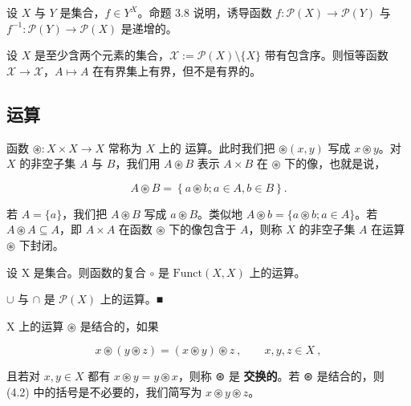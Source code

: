 \begin{example}

\begin{items}
\item

设 $X$ 与 $Y$ 是集合，$f \in Y^X$。命题 3.8 说明，诱导函数 $f: \mathcal{P}(X) \to \mathcal{P}(Y)$ 与 $f^{-1}: \mathcal{P}(Y) \to \mathcal{P}(X)$ 是递增的。

\item

设 $X$ 是至少含两个元素的集合，$\mathcal{X} := \mathcal{P}(X) \setminus \{X\}$ 带有包含序。则恒等函数 $\mathcal{X} \to \mathcal{X}$，$A \mapsto A$ 在有界集上有界，但不是有界的。

\end{items}

\end{example}

\subsection*{运算}

函数 $\circledast: X \times X \to X$ 常称为 $X$ 上的 $\text{运算}$。此时我们把 $\circledast(x, y)$ 写成 $x \circledast y$。对 $X$ 的非空子集 $A$ 与 $B$，我们用 $A \circledast B$ 表示 $A \times B$ 在 $\circledast$ 下的像，也就是说，

\begin{equation}
A\circledast B=\left\{a\circledast b;a\in A,b\in B\right\}.
\end{equation}

若  $ A = \{a\} $，我们把  $ A \circledast B $ 写成  $ a \circledast B $。类似地  $ A \circledast b = \{a \circledast b ; a \in A\} $。若  $ A \circledast A \subseteq A $，即  $ A \times A $ 在函数  $ \circledast $ 下的像包含于  $ A $，则称  $ X $ 的非空子集  $ A $ 在运算  $ \circledast $ 下封闭。

\begin{example}

\begin{items}
\item

设 X 是集合。则函数的复合  $ \circ $ 是  $ \mathrm{Funct}(X, X) $ 上的运算。

\item

$ \cup $ 与  $ \cap $ 是  $ \mathcal{P}(X) $ 上的运算。■

\end{items}

X 上的运算  $ \circledast $ 是结合的，如果

\begin{equation}
x\circledast(y\circledast z)=(x\circledast y)\circledast z~,\qquad x,y,z\in X~,
\end{equation}

且若对  $ x, y \in X $ 都有  $ x \circledast y = y \circledast x $，则称 ⊛ 是 \textbf{交换的}。若 ⊛ 是结合的，则 (4.2) 中的括号是不必要的，我们简写为  $ x \circledast y \circledast z $。

\end{example}

